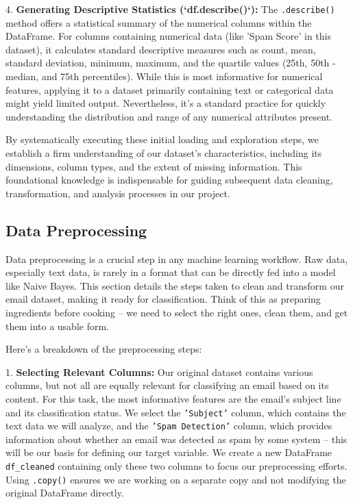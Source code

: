 \documentclass[12pt,a4paper]{article}
\begin{document}
4.  \textbf{Generating Descriptive Statistics (`df.describe()`):} The \texttt{.describe()} method offers a statistical summary of the numerical columns within the DataFrame. For columns containing numerical data (like 'Spam Score' in this dataset), it calculates standard descriptive measures such as count, mean, standard deviation, minimum, maximum, and the quartile values (25th, 50th - median, and 75th percentiles). While this is most informative for numerical features, applying it to a dataset primarily containing text or categorical data might yield limited output. Nevertheless, it's a standard practice for quickly understanding the distribution and range of any numerical attributes present.

By systematically executing these initial loading and exploration steps, we establish a firm understanding of our dataset's characteristics, including its dimensions, column types, and the extent of missing information. This foundational knowledge is indispensable for guiding subsequent data cleaning, transformation, and analysis processes in our project.


\subsection{Data Preprocessing}

Data preprocessing is a crucial step in any machine learning workflow. Raw data, especially text data, is rarely in a format that can be directly fed into a model like Naive Bayes. This section details the steps taken to clean and transform our email dataset, making it ready for classification. Think of this as preparing ingredients before cooking – we need to select the right ones, clean them, and get them into a usable form.

Here's a breakdown of the preprocessing steps:

1.  \textbf{Selecting Relevant Columns:} Our original dataset contains various columns, but not all are equally relevant for classifying an email based on its content. For this task, the most informative features are the email's subject line and its classification status. We select the \texttt{'Subject'} column, which contains the text data we will analyze, and the \texttt{'Spam Detection'} column, which provides information about whether an email was detected as spam by some system – this will be our basis for defining our target variable. We create a new DataFrame \texttt{df\_cleaned} containing only these two columns to focus our preprocessing efforts. Using \texttt{.copy()} ensures we are working on a separate copy and not modifying the original DataFrame directly.
\end{document}
